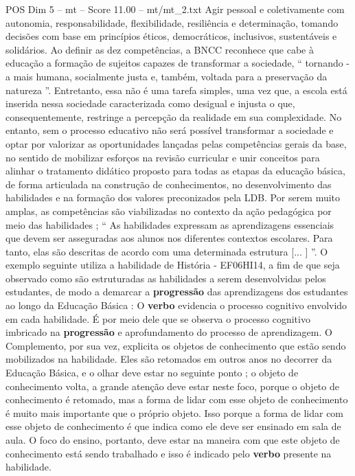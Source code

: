 \begin{textsample}{POS Dim 5 – mt – Score 11.00 – mt/mt\_2.txt}
Agir pessoal e coletivamente com autonomia, responsabilidade, flexibilidade, resiliência e determinação, tomando decisões com base em princípios éticos, democráticos, inclusivos, sustentáveis e solidários.
Ao definir as dez competências, a BNCC reconhece que cabe à educação a formação de sujeitos capazes de transformar a sociedade, “ tornando -a mais humana, socialmente justa e, também, voltada para a preservação da natureza ”.
Entretanto, essa não é uma tarefa simples, uma vez que, a escola está inserida nessa sociedade caracterizada como desigual e injusta o que, consequentemente, restringe a percepção da realidade em sua complexidade.
No entanto, sem o processo educativo não será possível transformar a sociedade e optar por valorizar as oportunidades lançadas pelas competências gerais da base, no sentido de mobilizar esforços na revisão curricular e unir conceitos para alinhar o tratamento didático proposto para todas as etapas da educação básica, de forma articulada na construção de conhecimentos, no desenvolvimento das habilidades e na formação dos valores preconizados pela LDB.
Por serem muito amplas, as competências são viabilizadas no contexto da ação pedagógica por meio das habilidades ; “ As habilidades expressam as aprendizagens essenciais que devem ser asseguradas aos alunos nos diferentes contextos escolares.
Para tanto, elas são descritas de acordo com uma determinada estrutura [... ] ”.
O exemplo seguinte utiliza a habilidade de História - EF06HI14, a fim de que seja observado como são estruturadas as habilidades a serem desenvolvidas pelos estudantes, de modo a demarcar a \textbf{progressão} das aprendizagens dos estudantes ao longo da Educação Básica : O \textbf{verbo} evidencia o processo cognitivo envolvido em cada habilidade.
É por meio dele que se observa o processo cognitivo imbricado na \textbf{progressão} e aprofundamento do processo de aprendizagem.
O Complemento, por sua vez, explicita os objetos de conhecimento que estão sendo mobilizados na habilidade.
Eles são retomados em outros anos no decorrer da Educação Básica, e o olhar deve estar no seguinte ponto ; o objeto de conhecimento volta, a grande atenção deve estar neste foco, porque o objeto de conhecimento é retomado, mas a forma de lidar com esse objeto de conhecimento é muito mais importante que o próprio objeto.
Isso porque a forma de lidar com esse objeto de conhecimento é que indica como ele deve ser ensinado em sala de aula.
O foco do ensino, portanto, deve estar na maneira com que este objeto de conhecimento está sendo trabalhado e isso é indicado pelo \textbf{verbo} presente na habilidade.

\end{textsample}
